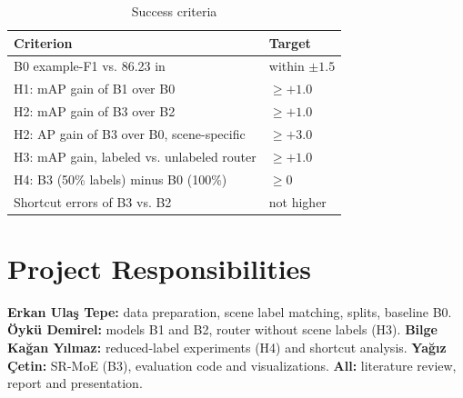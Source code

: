 \documentclass[9pt, conference, a4paper]{IEEEtran}
\begin{document}
\begin{table}[htbp]
\caption{Success criteria}
\begin{center}
\begin{tabular}{|>{\raggedright\arraybackslash}p{5.6cm}|>{\raggedright\arraybackslash}p{1.8cm}|}
\hline
\textbf{Criterion} & \textbf{Target} \\
\hline
B0 example-F1 vs. 86.23 in \cite{hua2020relation} & within $\pm 1.5$ \\
\hline
H1: mAP gain of B1 over B0 & $\geq +1.0$ \\
\hline
H2: mAP gain of B3 over B2 & $\geq +1.0$ \\
\hline
H2: AP gain of B3 over B0, scene-specific & $\geq +3.0$ \\
\hline
H3: mAP gain, labeled vs. unlabeled router & $\geq +1.0$ \\
\hline
H4: B3 (50\% labels) minus B0 (100\%) & $\geq 0$ \\
\hline
Shortcut errors of B3 vs. B2 & not higher \\
\hline
\end{tabular}
\label{tab:criteria}
\end{center}
\end{table}

\section{Project Responsibilities}
\textbf{Erkan Ulaş Tepe:} data preparation, scene label matching, splits, baseline B0. \textbf{Öykü Demirel:} models B1 and B2, router without scene labels (H3). \textbf{Bilge Kağan Yılmaz:} reduced-label experiments (H4) and shortcut analysis. \textbf{Yağız Çetin:} SR-MoE (B3), evaluation code and visualizations. \textbf{All:} literature review, report and presentation.
\end{document}
